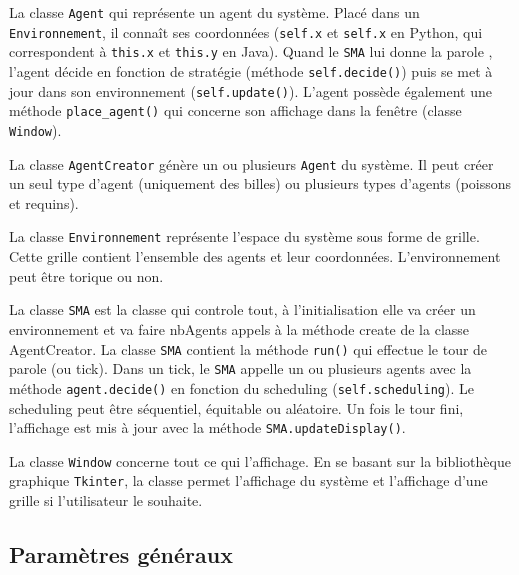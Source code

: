 \documentclass[a4paper]{article}
\begin{document}
\medskip
La classe \texttt{Agent} qui représente un agent du système. Placé dans un \texttt{Environnement}, il connaît ses coordonnées (\texttt{self.x} et \texttt{self.x} en Python, qui correspondent à \texttt{this.x} et \texttt{this.y} en Java). Quand le \texttt{SMA} lui \og donne la parole \fg{}, l'agent décide en fonction de stratégie (méthode \texttt{self.decide()}) puis se met à jour dans son environnement (\texttt{self.update()}). L'agent possède également une méthode \texttt{place\_agent()} qui concerne son affichage dans la fenêtre (classe \texttt{Window}).

\medskip
La classe \texttt{AgentCreator} génère un ou plusieurs \texttt{Agent} du système. Il peut créer un seul type d'agent (uniquement des billes) ou plusieurs types d'agents (poissons et requins).

\medskip
La classe \texttt{Environnement} représente l'espace du système sous forme de grille. Cette grille contient l'ensemble des agents et leur coordonnées. L'environnement peut être torique ou non. 

\medskip
La classe \texttt{SMA} est la classe qui controle tout, à l'initialisation elle va créer un environnement et va faire nbAgents appels à la méthode create de la classe AgentCreator.
La classe \texttt{SMA} contient la méthode \texttt{run()} qui effectue le tour de parole (ou tick). Dans un tick, le \texttt{SMA} appelle un ou plusieurs agents avec la méthode \texttt{agent.decide()} en fonction du scheduling (\texttt{self.scheduling}). Le scheduling peut être séquentiel, équitable ou aléatoire. Un fois le tour fini, l'affichage est mis à jour avec la méthode \texttt{SMA.updateDisplay()}.

\medskip
La classe \texttt{Window} concerne tout ce qui l'affichage. En se basant sur la bibliothèque graphique \texttt{Tkinter}, la classe permet l'affichage du système et l'affichage d'une grille si l'utilisateur le souhaite.

\subsection{Paramètres généraux}
\end{document}

